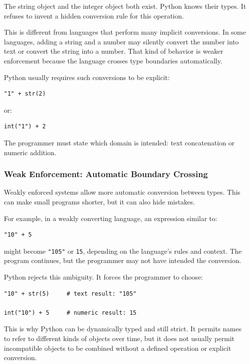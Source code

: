 The string object and the integer object both exist. Python knows their types. It refuses to invent a hidden conversion rule for this operation.

This is different from languages that perform many implicit conversions. In some languages, adding a string and a number may silently convert the number into text or convert the string into a number. That kind of behavior is weaker enforcement because the language crosses type boundaries automatically.

Python usually requires such conversions to be explicit:

\begin{verbatim}
"1" + str(2)
\end{verbatim}

or:

\begin{verbatim}
int("1") + 2
\end{verbatim}

The programmer must state which domain is intended: text concatenation or numeric addition.

\subsubsection*{Weak Enforcement: Automatic Boundary Crossing}

Weakly enforced systems allow more automatic conversion between types. This can make small programs shorter, but it can also hide mistakes.

For example, in a weakly converting language, an expression similar to:

\begin{verbatim}
"10" + 5
\end{verbatim}

might become \texttt{"105"} or \texttt{15}, depending on the language's rules and context. The program continues, but the programmer may not have intended the conversion.

Python rejects this ambiguity. It forces the programmer to choose:

\begin{verbatim}
"10" + str(5)     # text result: "105"

int("10") + 5     # numeric result: 15
\end{verbatim}

This is why Python can be dynamically typed and still strict. It permits names to refer to different kinds of objects over time, but it does not usually permit incompatible objects to be combined without a defined operation or explicit conversion.

